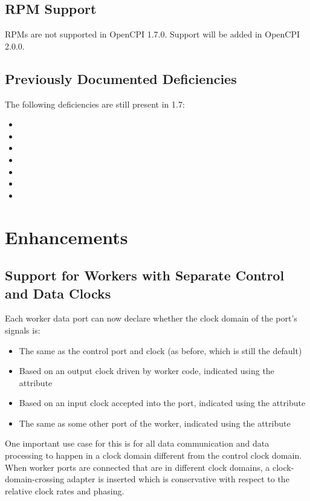 \subsection{RPM Support}
\label{bug:17_rpms}
RPMs are not supported in OpenCPI 1.7.0. Support will be added in OpenCPI 2.0.0.

\subsection{Previously Documented Deficiencies}
The following deficiencies are still present in 1.7:
\begin{itemize}
\setlength\itemsep{0em} %
\item {}
\item {}
\item {}
\item {}
\item {}
\item {}
\item {}
\end{itemize}


\def\ocpiversion{v1.6.2}  %
\section{Enhancements}
\subsection{Support for Workers with Separate Control and Data Clocks} %
\label{sec:16_clocks}
Each worker data port can now declare whether the clock domain of the port's signals is:
\begin{itemize}
\setlength\itemsep{0em} %
\item The same as the control port and clock (as before, which is still the default)
\item Based on an output clock driven by worker code, indicated using the  attribute
\item Based on an input clock accepted into the port, indicated using the  attribute
\item The same as some other port of the worker, indicated using the  attribute
\end{itemize}
One important use case for this is for all data communication and data processing to happen in a clock domain
different from the control clock domain.
When worker ports are connected that are in different clock domains, a clock-domain-crossing adapter is inserted which is conservative with respect to the relative clock rates and phasing.

